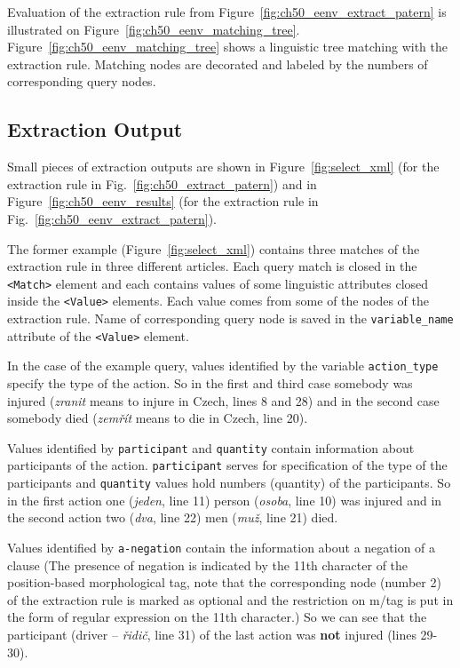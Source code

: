 Evaluation of the extraction rule from Figure~\ref{fig:ch50_eenv_extract_patern} is illustrated on Figure~\ref{fig:ch50_eenv_matching_tree}. Figure~\ref{fig:ch50_eenv_matching_tree} shows a linguistic tree matching with the extraction rule. Matching nodes are decorated and labeled by the numbers of corresponding query nodes.


\subsection{Extraction Output}

Small pieces of extraction outputs are shown in Figure~\ref{fig:select_xml} (for the extraction rule in Fig.~\ref{fig:ch50_extract_patern}) and in Figure~\ref{fig:ch50_eenv_results} (for the extraction rule in Fig.~\ref{fig:ch50_eenv_extract_patern}). 

The former example (Figure~\ref{fig:select_xml}) contains three matches of the extraction rule in three different articles. Each query match is closed in the \verb+<Match>+ element and each contains values of some linguistic attributes closed inside the \verb+<Value>+ elements. Each value comes from some of the nodes of the extraction rule. Name of corresponding query node is saved in the \verb+variable_name+ attribute of the \verb+<Value>+ element.

In the case of the example query, values identified by the variable \verb+action_type+ specify the type of the action. So in the first and third case somebody was injured (\emph{zranit} means to injure in Czech, lines 8 and 28) and in the second case somebody died (\emph{zemřít} means to die in Czech, line 20).

Values identified by \verb+participant+ and \verb+quantity+ contain information about participants of the action. \verb+participant+ serves for specification of the type of the participants and \verb+quantity+ values hold numbers (quantity) of the participants. So in the first action one (\emph{jeden}, line 11) person (\emph{osoba}, line 10) was injured and in the second action two (\emph{dva}, line 22) men (\emph{muž}, line 21) died.

Values identified by \verb+a-negation+ contain the information about a negation of a clause (The presence of negation is indicated by the 11th character of the position-based morphological tag, note that the corresponding node (number 2) of the extraction rule is marked as optional and the restriction on m/tag is put in the form of regular expression on the 11th character.) So we can see that the participant (driver -- \emph{řidič}, line 31) of the last action was \textbf{not} injured (lines 29-30).

